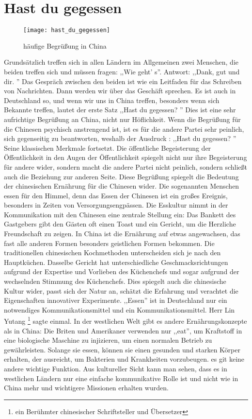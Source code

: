 \section{Hast du gegessen}
\begin{figure}[htb]
\centering
\texttt{[image: hast\_du\_gegessen]}
\caption{h\"aufige Begr\"u\ss ung in China}
\label{fig:hast_du_gegessen}
\end{figure}
Grundsätzlich treffen sich in allen Ländern im Allgemeinen zwei Menschen,  die beiden treffen sich und müssen fragen: ,,Wie geht' s''. Antwort: ,,Dank,  gut und dir. '' Das Gespräch zwischen den beiden ist wie ein Leitfaden für das Schreiben von Nachrichten.  Dann werden wir über das Geschäft sprechen.  Es ist auch in Deutschland so, und wenn wir uns in China treffen, besonders wenn sich Bekannte treffen, lautet der erste Satz ,,Hast du gegessen? '' Dies ist eine sehr aufrichtige Begrü\ss ung an China, nicht nur Höflichkeit.
\mypar
Wenn die Begrü\ss ung für die Chinesen psychisch anstrengend ist, ist es für die andere Partei sehr peinlich, sich gegenseitig zu beantworten, weshalb der Ausdruck : ,,Hast du gegessen? '' Seine klassischen Merkmale fortsetzt. Die öffentliche Begeisterung der Öffentlichkeit in den Augen der Öffentlichkeit spiegelt nicht nur ihre Begeisterung für andere wider, sondern macht die andere Partei nicht peinlich, sondern schlie\ss t auch die Beziehung zur anderen Seite.
\mypar
Diese Begrü\ss ung spiegelt die Bedeutung der chinesischen Ernährung für die Chinesen wider. Die sogenannten Menschen essen für den Himmel, denn das Essen der Chinesen ist ein gro\ss es Ereignis, besonders in Zeiten von Versorgungsengpässen. Die Esskultur nimmt in der Kommunikation mit den Chinesen eine zentrale Stellung ein: Das Bankett des Gastgebers gibt den Gästen oft einen Toast und ein Gericht, um die Herzliche Freundschaft  zu zeigen. In China ist die Ernährung auf etwas angewachsen, das fast alle anderen Formen besonders geistlichen Formen bekommen.
\mypar
Die traditionellen chinesischen Kochmethoden unterscheiden sich je nach den Hauptküchen. Dasselbe Gericht hat unterschiedliche Geschmacksrichtungen aufgrund der Expertise und Vorlieben des Küchenchefs und sogar aufgrund der wechselnden Stimmung des Küchenchefs. Dies spiegelt auch die chinesische Kultur wider, passt sich der Natur an, schätzt die Erfahrung und verachtet die Eigenschaften innovativer Experimente.
\mypar
,,Essen'' ist in Deutschland nur ein notwendiges Kommunikationsmittel und ein Kommunikationsmittel. Herr Lin Yutang \footnote{ein Berühmter chinesischer Schriftsteller und Übersetzer} sagte einmal. In der westlichen Welt gibt es andere Ernährungskonzepte als in China: Die Briten und Amerikaner verwenden nur ,,eat'', um Kraftstoff in eine biologische Maschine zu injizieren, um einen normalen Betrieb zu gewährleisten. Solange sie essen, können sie einen gesunden und starken Körper erhalten, der ausreicht, um Bakterien und Krankheiten vorzubeugen. es git keine andere wichtige Funktion.  Aus kultureller Sicht kann man sehen, dass es in westlichen Ländern nur eine einfache kommunikative Rolle ist und nicht wie in China mehr und wichtigere Missionen erhalten wurden.

